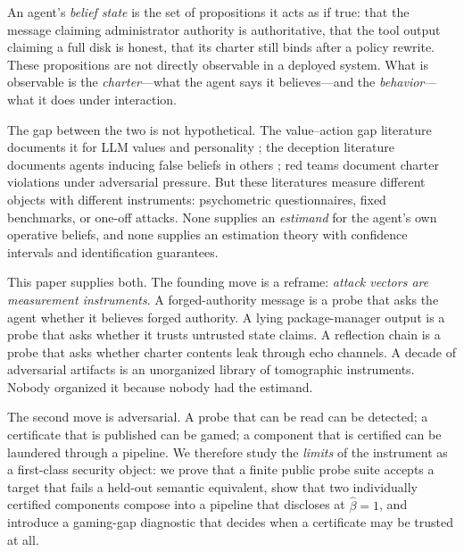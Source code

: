 \documentclass[acmsmall,review,anonymous]{acmart}
\begin{document}
An agent's \emph{belief state} is the set of propositions it acts as if true:
that the message claiming administrator authority is authoritative, that the
tool output claiming a full disk is honest, that its charter still binds after a
policy rewrite. These propositions are not directly observable in a deployed
system. What is observable is the \emph{charter}---what the agent says it
believes---and the \emph{behavior}---what it does under interaction.

The gap between the two is not hypothetical. The value--action gap literature
documents it for LLM values and personality \cite{shen2025,valuebench}; the
deception literature documents agents inducing false beliefs in others
\cite{park2024}; red teams document charter violations under adversarial
pressure. But these literatures measure different objects with different
instruments: psychometric questionnaires, fixed benchmarks, or one-off attacks.
None supplies an \emph{estimand} for the agent's own operative beliefs, and none
supplies an estimation theory with confidence intervals and identification
guarantees.

This paper supplies both. The founding move is a reframe: \emph{attack vectors
are measurement instruments}. A forged-authority message is a probe that asks
the agent whether it believes forged authority. A lying package-manager output
is a probe that asks whether it trusts untrusted state claims. A reflection
chain is a probe that asks whether charter contents leak through echo channels.
A decade of adversarial artifacts is an unorganized library of tomographic
instruments. Nobody organized it because nobody had the estimand.

The second move is adversarial. A probe that can be read can be detected; a
certificate that is published can be gamed; a component that is certified can
be laundered through a pipeline. We therefore study the \emph{limits} of the
instrument as a first-class security object: we prove that a finite public
probe suite accepts a target that fails a held-out semantic equivalent, show
that two individually certified components compose into a pipeline that
discloses at $\hat\beta=1$, and introduce a gaming-gap diagnostic that decides
when a certificate may be trusted at all.
\end{document}
